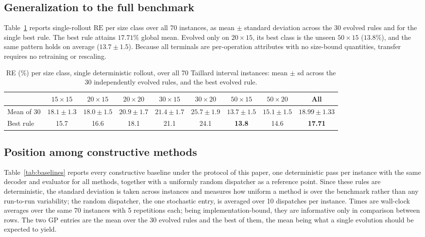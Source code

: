 \documentclass[review,authoryear,11pt]{elsarticle}
\newcommand{\RE}{\mathrm{RE}}
\begin{document}
\subsection{Generalization to the full benchmark}
Table~\ref{tab:gp70} reports single-rollout $\RE$ per size class over all
70 instances, as mean $\pm$ standard deviation across the 30 evolved
rules and for the single best rule. The best rule attains $17.71\%$
global mean. Evolved only on $20{\times}15$, its best class is the
unseen $50{\times}15$ ($13.8\%$), and the same pattern holds on
average ($13.7 \pm 1.5$). Because all terminals are per-operation
attributes with no size-bound quantities, transfer requires no
retraining or rescaling.

\begin{table}[t]
\centering\small
\caption{RE (\%) per size class, single deterministic rollout, over all
70 Taillard interval instances: mean $\pm$ sd across the 30 independently
evolved rules, and the best evolved rule.}
\label{tab:gp70}
\setlength{\tabcolsep}{2.5pt}
\scriptsize
\begin{tabular}{lccccccc|c}
\toprule
& $15{\times}15$ & $20{\times}15$ & $20{\times}20$ &
$30{\times}15$ & $30{\times}20$ & $50{\times}15$ & $50{\times}20$ & All \\
\midrule
Mean of 30 & $18.1{\pm}1.3$ & $18.0{\pm}1.5$ & $20.9{\pm}1.7$ &
$21.4{\pm}1.7$ & $25.7{\pm}1.9$ & $13.7{\pm}1.5$ & $15.1{\pm}1.5$ &
$18.99{\pm}1.33$ \\
Best rule & 15.7 & 16.6 & 18.1 & 21.1 & 24.1 & \textbf{13.8} & 14.6 &
\textbf{17.71} \\
\bottomrule
\end{tabular}
\end{table}

\subsection{Position among constructive methods}
\label{sec:baselines}
Table~\ref{tab:baselines} reports every constructive baseline under the
protocol of this paper, one deterministic pass per instance with the
same decoder and evaluator for all methods, together with a uniformly
random dispatcher as a reference point. Since these rules are
deterministic, the standard deviation is taken across instances and
measures how uniform a method is over the benchmark rather than any
run-to-run variability; the random dispatcher, the one stochastic entry,
is averaged over 10 dispatches per instance. Times are wall-clock
averages over the same 70 instances with 5 repetitions each; being
implementation-bound, they are informative only in comparison between
rows. The two GP entries are the mean over the 30 evolved rules and the
best of them, the mean being what a single evolution should be expected
to yield.
\end{document}
